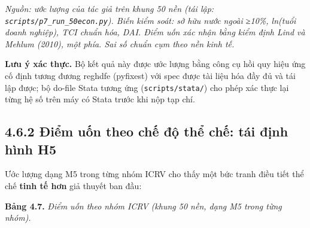 \documentclass[
  a4paper,
  13pt]{extreport}
\begin{document}
\emph{Nguồn: ước lượng của tác giả trên khung 50 nền (tái lập:
\texttt{scripts/p7\_run\_50econ.py}). Biến kiểm soát: sở hữu nước ngoài
≥10\%, ln(tuổi doanh nghiệp), TCI chuẩn hóa, DAI. Điểm uốn xác nhận bằng
kiểm định Lind và Mehlum (2010), một phía. Sai số chuẩn cụm theo nền
kinh tế.}

\textbf{Lưu ý xác thực.} Bộ kết quả này được ước lượng bằng công cụ hồi
quy hiệu ứng cố định tương đương reghdfe (pyfixest) với spec được tài
liệu hóa đầy đủ và tái lập được; bộ do-file Stata tương ứng
(\texttt{scripts/stata/}) cho phép xác thực lại từng hệ số trên máy có
Stata trước khi nộp tạp chí.

\hypertarget{ux111iux1ec3m-uux1ed1n-theo-chux1ebf-ux111ux1ed9-thux1ec3-chux1ebf-tuxe1i-ux111ux1ecbnh-huxecnh-h5}{%
\subsection{4.6.2 Điểm uốn theo chế độ thể chế: tái định hình
H5}\label{ux111iux1ec3m-uux1ed1n-theo-chux1ebf-ux111ux1ed9-thux1ec3-chux1ebf-tuxe1i-ux111ux1ecbnh-huxecnh-h5}}

Ước lượng dạng M5 trong từng nhóm ICRV cho thấy một bức tranh điều tiết
thể chế \textbf{tinh tế hơn} giả thuyết ban đầu:

\textbf{Bảng 4.7.} \emph{Điểm uốn theo nhóm ICRV (khung 50 nền, dạng M5
trong từng nhóm).}
\end{document}
